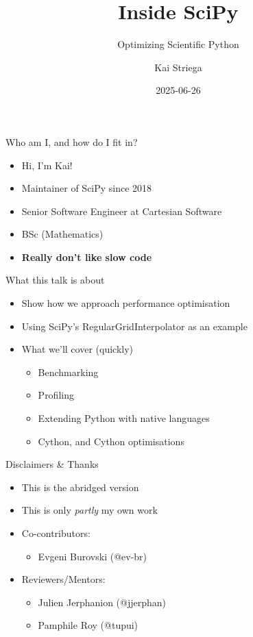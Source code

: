 \documentclass[12pt,xcolor=dvipsnames]{beamer}
\title{Inside SciPy}
\subtitle{Optimizing Scientific Python}
\date{2025-06-26}
\author{Kai Striega}
\institute{Cartesian Software \& SciPy}
\begin{document}
    \maketitle
    \begin{frame}{Who am I, and how do I fit in?}
        \begin{itemize}
            \item Hi, I'm Kai!
            \item Maintainer of SciPy since 2018
            \item Senior Software Engineer at Cartesian Software
            \item BSc (Mathematics)
            \item \textbf{Really don't like slow code}
        \end{itemize}
    \end{frame}

    \begin{frame}{What this talk is about}
        \begin{itemize}
            \item Show how we approach performance optimisation
            \item Using SciPy’s RegularGridInterpolator as an example
            \item What we'll cover (quickly)
            \begin{itemize}
                \item Benchmarking
                \item Profiling
                \item Extending Python with native languages
                \item Cython, and Cython optimisations
            \end{itemize}
        \end{itemize}
    \end{frame}

    \begin{frame}{Disclaimers \& Thanks}
        \begin{itemize}
            \item<1-> This is the abridged version
            \item<2-> This is only \textit{partly} my own work
            \item<3-> Co-contributors:
            \begin{itemize}
                \item Evgeni Burovski (@ev-br)
            \end{itemize}
            \item<4-> Reviewers/Mentors:
            \begin{itemize}
                \item Julien Jerphanion (@jjerphan)
                \item Pamphile Roy (@tupui)
            \end{itemize}
        \end{itemize}
    \end{frame}
\end{document}
